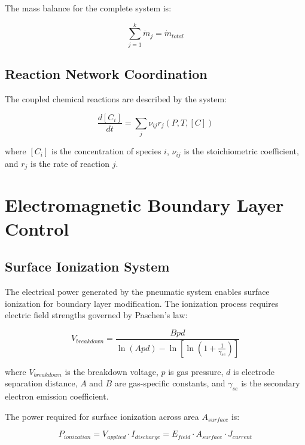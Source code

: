 \documentclass[12pt,a4paper]{article}
\begin{document}
The mass balance for the complete system is:

\begin{equation}
\sum_{j=1}^{k} \dot{m}_j = \dot{m}_{total}
\end{equation}

\subsection{Reaction Network Coordination}

The coupled chemical reactions are described by the system:

\begin{equation}
\frac{d[C_i]}{dt} = \sum_{j} \nu_{ij} r_j(P, T, [C])
\end{equation}

where $[C_i]$ is the concentration of species $i$, $\nu_{ij}$ is the stoichiometric coefficient, and $r_j$ is the rate of reaction $j$.

\section{Electromagnetic Boundary Layer Control}

\subsection{Surface Ionization System}

The electrical power generated by the pneumatic system enables surface ionization for boundary layer modification. The ionization process requires electric field strengths governed by Paschen's law:

\begin{equation}
V_{breakdown} = \frac{Bpd}{\ln(Apd) - \ln\left[\ln\left(1 + \frac{1}{\gamma_{se}}\right)\right]}
\end{equation}

where $V_{breakdown}$ is the breakdown voltage, $p$ is gas pressure, $d$ is electrode separation distance, $A$ and $B$ are gas-specific constants, and $\gamma_{se}$ is the secondary electron emission coefficient.

The power required for surface ionization across area $A_{surface}$ is:

\begin{equation}
P_{ionization} = V_{applied} \cdot I_{discharge} = E_{field} \cdot A_{surface} \cdot J_{current}
\end{equation}
\end{document}
